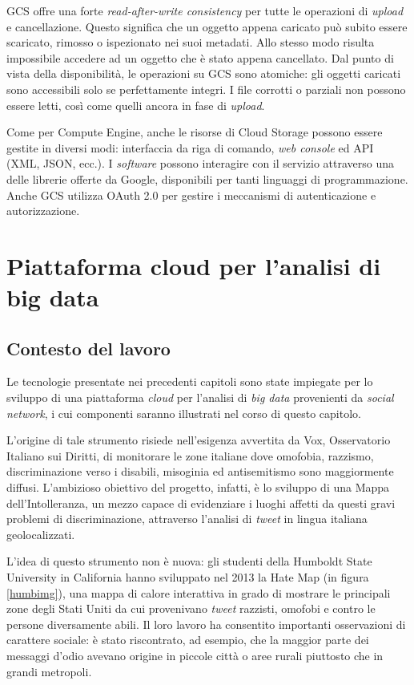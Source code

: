 GCS offre una forte \textit{read-after-write consistency} per tutte le operazioni di \textit{upload} e cancellazione. Questo significa che un oggetto appena caricato può subito essere scaricato, 
rimosso o ispezionato nei suoi metadati. Allo stesso modo risulta impossibile accedere ad un oggetto che è stato appena cancellato. Dal punto di vista della disponibilità, le 
operazioni su GCS sono atomiche: gli oggetti caricati sono accessibili solo se perfettamente integri. I file corrotti o parziali non possono essere letti, così come quelli ancora 
in fase di \textit{upload}.

Come per Compute Engine, anche le risorse di Cloud Storage possono essere gestite in diversi modi: interfaccia da riga di comando, \textit{web console} ed API (XML, JSON, ecc.). I \textit{software} 
possono interagire con il servizio attraverso una delle librerie offerte da Google, disponibili per tanti linguaggi di programmazione. Anche GCS utilizza OAuth 2.0 per gestire i
meccanismi di autenticazione e autorizzazione.

\chapter{Piattaforma cloud per l'analisi di big data}
\label{chap:platform}

\section{Contesto del lavoro}

Le tecnologie presentate nei precedenti capitoli sono state impiegate per lo sviluppo di una piattaforma \textit{cloud} per l’analisi di \textit{big data} provenienti da \textit{social network}, i cui 
componenti saranno illustrati nel corso di questo capitolo.

L’origine di tale strumento risiede nell’esigenza avvertita da Vox, Osservatorio Italiano sui Diritti, di monitorare le zone italiane dove omofobia, razzismo, discriminazione verso
i disabili, misoginia ed antisemitismo sono maggiormente diffusi. L’ambizioso obiettivo del progetto, infatti, è lo sviluppo di una Mappa dell’Intolleranza, un mezzo capace di 
evidenziare i luoghi affetti da questi gravi problemi di discriminazione, attraverso l’analisi di \textit{tweet} in lingua italiana geolocalizzati. 

L’idea di questo strumento non è nuova: gli studenti della Humboldt State University in California hanno sviluppato nel 2013 la Hate Map (in figura \ref{humbimg}), una mappa di calore interattiva 
in grado di mostrare le principali zone degli Stati Uniti da cui provenivano \textit{tweet} razzisti, omofobi e contro le persone diversamente abili. Il loro lavoro ha consentito importanti 
osservazioni di carattere sociale: è stato riscontrato, ad esempio, che la maggior parte dei messaggi d’odio avevano origine in piccole città o aree rurali piuttosto che in grandi 
metropoli.

